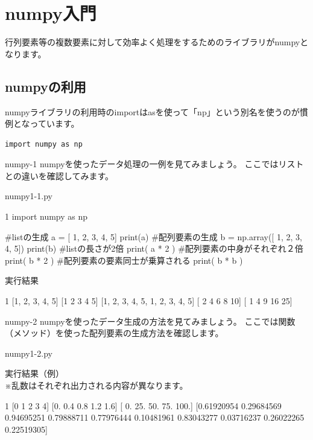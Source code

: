 \section{numpy入門}
行列要素等の複数要素に対して効率よく処理をするためのライブラリがnumpyとなります。
\subsection{numpyの利用}

numpyライブラリの利用時のimportはasを使って「np」という別名を使うのが慣例となっています。

\begin{verbatim}
import numpy as np
\end{verbatim}


\begin{pabox}{numpy-1}
numpyを使ったデータ処理の一例を見てみましょう。
ここではリストとの違いを確認してみます。

\begin{legbox}{numpy1-1.py}
\begin{listing}{1}
import numpy as np

#listの生成
a = [ 1, 2, 3, 4, 5]
print(a)
#配列要素の生成
b = np.array([ 1, 2, 3, 4, 5])
print(b)
#listの長さが2倍
print( a * 2 )
#配列要素の中身がそれぞれ２倍
print( b * 2 )
#配列要素の要素同士が乗算される
print( b * b )
\end{listing}

実行結果\\
\begin{listing}{1}
[1, 2, 3, 4, 5]
[1 2 3 4 5]
[1, 2, 3, 4, 5, 1, 2, 3, 4, 5]
[ 2  4  6  8 10]
[ 1  4  9 16 25]
\end{listing}
\end{legbox}

\end{pabox}

\begin{pabox}{numpy-2}
numpyを使ったデータ生成の方法を見てみましょう。
ここでは関数（メソッド）を使った配列要素の生成方法を確認します。

\begin{legbox}{numpy1-2.py}

実行結果（例）\\
※乱数はそれぞれ出力される内容が異なります。\\
\begin{listing}{1}
[0 1 2 3 4]
[0.  0.4 0.8 1.2 1.6]
[  0.  25.  50.  75. 100.]
[0.61920954 0.29684569 0.94695251 0.79888711 0.77976444 0.10481961
 0.83043277 0.03716237 0.26022265 0.22519305]
\end{listing}
\end{legbox}

\end{pabox}


